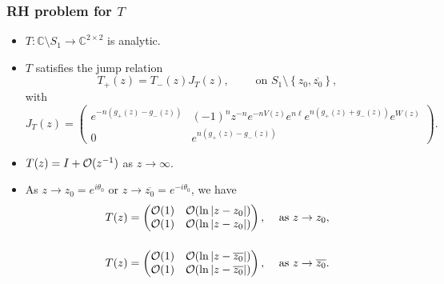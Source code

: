 \documentclass[11pt,fleqn]{article}
\numberwithin{equation}{section}
\def\bigO{{\cal O}}
\begin{document}
\subsubsection*{RH problem for $T$}
\begin{itemize}
\item[(a)] $T : \mathbb{C}\setminus S_{1} \to \mathbb{C}^{2\times 2}$ is analytic.
\item[(b)] $T$ satisfies the jump relation
\begin{equation}
T_{+}(z) = T_{-}(z) J_{T}(z),\qquad \mbox{ on } S_{1}\setminus \left\{z_{0},\overline{z_{0}}\right\},
\end{equation}
with
\begin{equation*}
J_{T}(z) = \begin{pmatrix}
\displaystyle e^{-n(g_{+}(z)-g_{-}(z))} & \displaystyle (-1)^{n}z^{-n}e^{-nV(z)}e^{n\ell}e^{n(g_{+}(z)+g_{-}(z))}e^{W(z)} \\
\displaystyle 0 & \displaystyle e^{n(g_{+}(z)-g_{-}(z))}
\end{pmatrix}.
\end{equation*}
\item[(c)] $T(z) = I + \bigO(z^{-1})$ as $z \to \infty$.
\item[(d)] As $z\to z_0=e^{i\theta_0}$ or $z\to\overline {z_0}=e^{-i\theta_0}$, we have
\begin{equation*}
\begin{array}{l l}
T(z) = \begin{pmatrix}
\bigO(1) & \bigO(\ln |z-z_0|) \\ \bigO(1) & \bigO(\ln |z-z_0|)
\end{pmatrix},  &  \mbox{ as } z \to z_0, \\ [0.8cm]
T(z) = \begin{pmatrix}
\bigO(1) & \bigO(\ln |z-\overline{z_0}|) \\ \bigO(1) & \bigO(\ln |z-\overline{z_0}|)
\end{pmatrix}, &  \mbox{ as } z \to \overline{z_0}.
\end{array}
\end{equation*}
\end{itemize}
\end{document}
